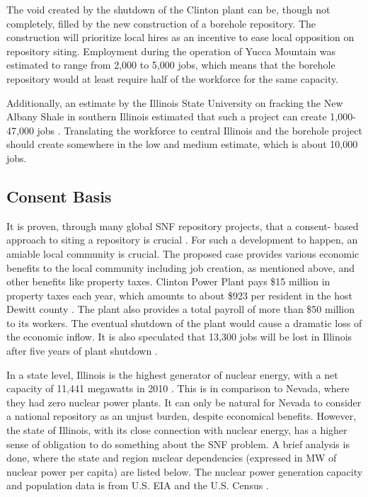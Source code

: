 

The void created by the shutdown of the Clinton plant can be, though not
completely, filled by the new construction of a borehole repository. The construction
will prioritize local hires as an incentive to ease local opposition on repository
 siting. Employment during the operation of Yucca Mountain was estimated to range from
 2,000 to 5,000 jobs, \cite{Riddel_2003} which means that the borehole repository
 would at least require half of the workforce for the same capacity. 

Additionally, an estimate by the Illinois State University on fracking the New Albany
Shale in southern Illinois estimated that such a project can create 1,000-47,000 jobs
\cite{Loomis_2012}. Translating the workforce to central Illinois and the borehole
project should create somewhere in the low and medium estimate, which is about 10,000
jobs.   


\subsection{Consent Basis}
It is proven, through many global \gls{SNF} repository projects, that a consent-
based approach to siting a repository is crucial 
\cite{ayers_blue_2012,doe_designing_2016,jenkins-smith_public_2013,freeze_siting_2015}. 
For such a development to happen, an amiable local community is crucial. 
The proposed case provides various economic benefits to the local community including
job creation, as mentioned above, and other benefits like property taxes. Clinton
Power Plant pays \$15 million in property taxes each year, which amounts to about 
\$923 per resident in the host Dewitt county \cite{Brady-Lunny_2016}. The plant
also provides a total payroll of more than \$50 million to its workers.
The eventual shutdown of the plant would cause a dramatic loss of the economic inflow.
It is also speculated that 13,300 jobs will be lost in Illinois after five years 
of plant shutdown \cite{Reid_2014}.  

In a state level, Illinois is the highest generator of nuclear energy, with a net
capacity of 11,441 megawatts in 2010 \cite{EIA_2010}. This is in comparison to 
Nevada, where they had zero nuclear power plants. It can only be natural for Nevada
to consider a national repository as an unjust burden, despite economical benefits.
However, the state of Illinois, with its close connection with nuclear energy,
has a higher sense of obligation to do something about the \gls{SNF} problem.
A brief analysis is done, where the state and region nuclear dependencies (expressed
in MW of nuclear power per capita) are listed below. The nuclear power generation capacity
and population data is from U.S. \gls{EIA} \cite{EIA_2010} and the U.S. Census \cite{census}.


